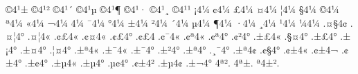 {^^a94^^b9^^b1
^^a94^^b9^^b2
^^a94^^b9^^b4
^^a94^^b9^^b5
^^a94^^b9^^b6
^^a94^^b9^^b7
^^a94^^b9^^b8
^^a94^^b9^^b9
^^a14^^bc
^^a24^^bc
^^a34^^bc
^^a44^^bc
^^a64^^bc
^^a74^^bc
^^a94^^bc
^^aa4^^bc
^^ab4^^bc
^^ac4^^bc
^^ad4^^bc
^^af4^^bc
^^b04^^bc
^^b14^^bc
^^b24^^bc
^^b44^^bc
^^b54^^bc
^^b64^^bc
^^b74^^bc
^^b84^^bc
^^b94^^bc
^^bc4^^bc
.^^a4^^a74^^a2
.^^a4^^a64^^b0
.^^a4^^a64^^ab
.^^a2^^a34^^ab
.^^a2^^a44^^ab
.^^a2^^a34^^b0
.^^a2^^a34^^ad
.^^a2^^af4^^ab
.^^a2^^aa4^^ab
.^^a2^^aa4^^b0
.^^a2^^b24^^b0
.^^b1^^a34^^ab
.^^a7^^a44^^b0
.^^b1^^a34^^b0
.^^b1^^a14^^b0
.^^b1^^a44^^b0
.^^a6^^a44^^b0
.^^b1^^aa4^^ab
.^^b1^^af4^^ab
.^^b1^^af4^^b0
.^^b1^^b24^^b0
.^^b1^^aa4^^b0
.^^b8^^af4^^b0
.^^b1^^aa4^^a2
.^^a2^^a74^^b0
.^^a2^^b14^^ab
.^^a2^^b14^^ac
.^^a2^^b14^^b0
.^^b1^^a24^^b0
.^^b1^^b54^^ab
.^^b1^^b54^^b0
.^^b5^^a24^^b0
.^^a2^^b14^^b2
.^^b1^^b54^^a2
.^^b1^^ac4^^b0
^^ad4^^aa^^b2.
^^ad4^^aa^^b1.
^^aa4^^b1^^b2.
}
